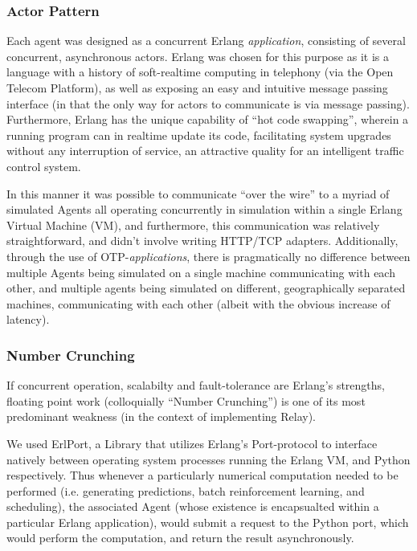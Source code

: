 \documentclass{report}
\begin{document}
\subsubsection{Actor Pattern}
Each agent was designed as a concurrent Erlang \emph{application}, consisting of several concurrent, asynchronous actors.
Erlang was chosen for this purpose as it is a language with a history of soft-realtime computing in telephony (via the Open Telecom Platform), as well as exposing an easy and intuitive message passing interface (in that the only way for actors to communicate is via message passing).
Furthermore, Erlang has the unique capability of ``hot code swapping'', wherein a running program can in realtime update its code, facilitating system upgrades without any interruption of service, an attractive quality for an intelligent traffic control system.

In this manner it was possible to communicate ``over the wire'' to a myriad of simulated Agents all operating concurrently in simulation within a single Erlang Virtual Machine (VM), and furthermore, this communication was relatively straightforward, and didn't involve writing HTTP/TCP adapters.
Additionally, through the use of OTP-\emph{applications}, there is pragmatically no difference between multiple Agents being simulated on a single machine communicating with each other, and multiple agents being simulated on different, geographically separated machines, communicating with each other (albeit with the obvious increase of latency).

\subsubsection{Number Crunching}
If concurrent operation, scalabilty and fault-tolerance are Erlang's strengths, floating point work (colloquially ``Number Crunching'') is one of its most predominant weakness (in the context of implementing Relay).

We used ErlPort, a Library that utilizes Erlang's Port-protocol to interface natively between operating system processes running the Erlang VM, and Python respectively.
Thus whenever a particularly numerical computation needed to be performed (i.e. generating predictions, batch reinforcement learning, and scheduling), the associated Agent (whose existence is encapsualted within a particular Erlang application), would submit a request to the Python port, which would perform the computation, and return the result asynchronously.
\end{document}
